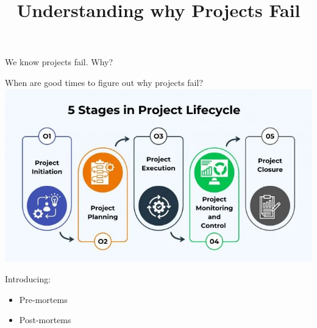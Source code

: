 \documentclass[aspectratio=169]{beamer}
\title{Understanding why Projects Fail}
\institute{Engineers for Exploration, UC San Diego}
\begin{document}
\maketitle
\begin{frame}
    We know projects fail.  Why?
\end{frame}
\begin{frame}
    When are good times to figure out why projects fail?
    \centering
    \includegraphics[width=.8\textwidth,height=0.7\textheight,keepaspectratio]{17_project_lifecycle.png}
\end{frame}
\begin{frame}
    Introducing:
    \begin{itemize}
        \item Pre-mortems
        \item Post-mortems
    \end{itemize}
\end{frame}
\end{document}
